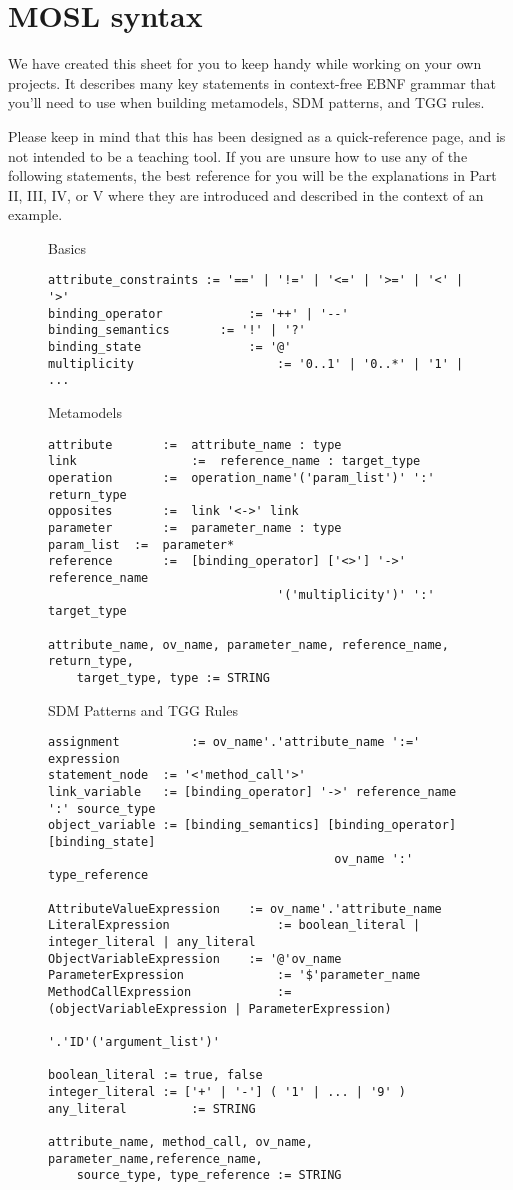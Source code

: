 \newpage
\section{MOSL syntax}
\texHeader

We have created this sheet for you to keep handy while working on your own projects. It describes many key statements in context-free EBNF grammar that you'll
need to use when building metamodels, SDM patterns, and TGG rules.

Please keep in mind that this has been designed as a quick-reference page, and is not intended to be a teaching tool. If you are unsure how to use any
of the following statements, the best reference for you will be the explanations in Part II, III, IV, or V where they are introduced and described in the
context of an example.

\begin{figure}[htbp]
Basics
\begin{lstlisting}[backgroundcolor=\color{codelightgray}]
attribute_constraints := '==' | '!=' | '<=' | '>=' | '<' | '>'
binding_operator 			:= '++' | '--'
binding_semantics 		:= '!' | '?'
binding_state 				:= '@'
multiplicity 					:= '0..1' | '0..*' | '1' | ...
\end{lstlisting}

Metamodels
\begin{lstlisting}[backgroundcolor=\color{codelightgray}]
attribute		:=	attribute_name : type
link				:=	reference_name : target_type
operation		:=	operation_name'('param_list')' ':' return_type
opposites		:=	link '<->' link
parameter		:=	parameter_name : type
param_list	:=	parameter*
reference		:=	[binding_operator] ['<>'] '->' reference_name 
								'('multiplicity')' ':' target_type

attribute_name, ov_name, parameter_name, reference_name, return_type, 
	target_type, type := STRING
\end{lstlisting}

SDM Patterns and TGG Rules
\begin{lstlisting}[backgroundcolor=\color{codelightgray}]
assignment			:= ov_name'.'attribute_name ':=' expression
statement_node	:= '<'method_call'>'
link_variable 	:= [binding_operator] '->' reference_name ':' source_type
object_variable := [binding_semantics] [binding_operator] [binding_state] 
										ov_name ':' type_reference
										
AttributeValueExpression 	:= ov_name'.'attribute_name
LiteralExpression 				:= boolean_literal | integer_literal | any_literal
ObjectVariableExpression 	:= '@'ov_name
ParameterExpression 			:= '$'parameter_name
MethodCallExpression 			:= (objectVariableExpression | ParameterExpression)
															'.'ID'('argument_list')'

boolean_literal := true, false
integer_literal := ['+' | '-'] ( '1' | ... | '9' )
any_literal 		:= STRING

attribute_name, method_call, ov_name, parameter_name,reference_name, 
	source_type, type_reference := STRING
\end{lstlisting}
\end{figure}
